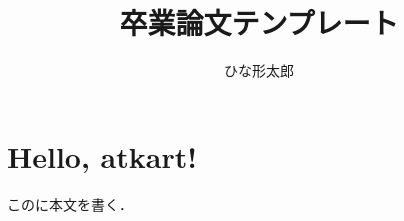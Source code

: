 \documentclass[luaLatex]{atkart}
\title{卒業論文テンプレート}
\author{ひな形\　太郎}
\begin{document}
\maketitle

\section{Hello, atkart!}

このに本文を書く．
\end{document}
